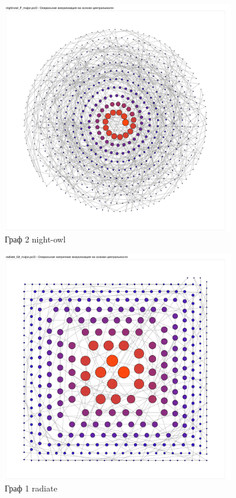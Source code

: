 \begin{figure}[H]
	\caption{Граф 2 night-owl}
	\includegraphics[width=0.9\textwidth]{img/night-owl2.pdf}
\end{figure}

\begin{figure}[H]
	\caption{Граф 1 radiate}
	\includegraphics[width=0.9\textwidth]{img/radiate1.pdf}
\end{figure}

